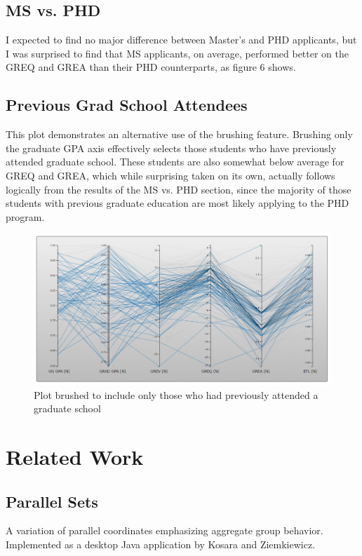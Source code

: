 \documentclass[]{article}
\begin{document}
	\subsection {MS vs. PHD}
		I expected to find no major difference between Master's and PHD applicants, but I was surprised to find that MS applicants, on average, performed better on the GREQ and GREA than their PHD counterparts, as figure 6 shows.
		
	\subsection{Previous Grad School Attendees}
		This plot demonstrates an alternative use of the brushing feature. Brushing only the graduate GPA axis effectively selects those students who have previously attended graduate school. These students are also somewhat below average for GREQ and GREA, which while surprising taken on its own, actually follows logically from the results of the MS vs. PHD section, since the majority of those students with previous graduate education are most likely applying to the PHD program.
		\begin{figure}[h]
			\includegraphics[width=\linewidth]{grads_only.png}
			\caption{Plot brushed to include only those who had previously attended a graduate school}
			\label{fig:MS_PHD}
		\end{figure}
	\pagebreak
\section{Related Work}
	\subsection{Parallel Sets}
	A variation of parallel coordinates emphasizing aggregate group behavior. Implemented as a desktop Java application by Kosara and Ziemkiewicz.
\end{document}
